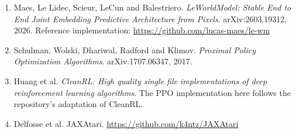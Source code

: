 \documentclass[11pt,a4paper]{article}
\begin{document}
\begin{enumerate}
\item Maes, Le Lidec, Scieur, LeCun and Balestriero. \emph{LeWorldModel: Stable End
to End Joint Embedding Predictive Architecture from Pixels}. arXiv:2603.19312,
2026. Reference implementation: \url{https://github.com/lucas-maes/le-wm}
\item Schulman, Wolski, Dhariwal, Radford and Klimov. \emph{Proximal Policy
Optimization Algorithms}. arXiv:1707.06347, 2017.
\item Huang et al. \emph{CleanRL: High quality single file implementations of deep
reinforcement learning algorithms}. The PPO implementation here follows the
repository's adaptation of CleanRL.
\item Delfosse et al. JAXAtari. \url{https://github.com/k4ntz/JAXAtari}
\end{enumerate}
\end{document}
